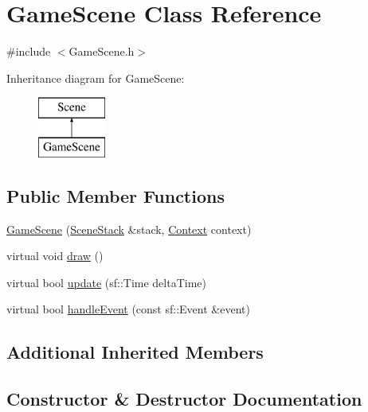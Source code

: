 \hypertarget{class_game_scene}{}\section{Game\+Scene Class Reference}
\label{class_game_scene}


{\ttfamily \#include $<$Game\+Scene.\+h$>$}

Inheritance diagram for Game\+Scene\+:\begin{figure}[H]
\begin{center}
\leavevmode
\includegraphics[height=2.000000cm]{class_game_scene}
\end{center}
\end{figure}
\subsection*{Public Member Functions}
\begin{DoxyCompactItemize}
\item 
\hyperlink{class_game_scene_a09ae1eacea6ea92074d008c016e0ed1f}{Game\+Scene} (\hyperlink{class_scene_stack}{Scene\+Stack} \&stack, \hyperlink{struct_scene_1_1_context}{Context} context)
\item 
virtual void \hyperlink{class_game_scene_ae9eb60cbb8fa55eeb07b951e3d83f426}{draw} ()
\item 
virtual bool \hyperlink{class_game_scene_ae54628d2f041bcad66242584b2db10d6}{update} (sf\+::\+Time delta\+Time)
\item 
virtual bool \hyperlink{class_game_scene_aa494372b1f451f3c3a268558fddb30f2}{handle\+Event} (const sf\+::\+Event \&event)
\end{DoxyCompactItemize}
\subsection*{Additional Inherited Members}


\subsection{Constructor \& Destructor Documentation}
\hypertarget{class_game_scene_a09ae1eacea6ea92074d008c016e0ed1f}{}\label{class_game_scene_a09ae1eacea6ea92074d008c016e0ed1f} 
